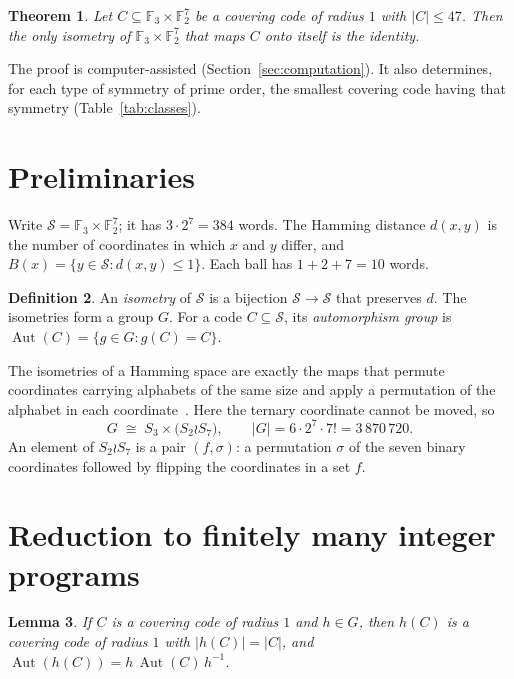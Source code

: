 \documentclass[11pt]{article}
\newtheorem{theorem}{Theorem}
\newtheorem{lemma}[theorem]{Lemma}
\theoremstyle{definition}
\newtheorem{definition}[theorem]{Definition}
\theoremstyle{remark}
\newcommand{\F}{\mathbb{F}}
\newcommand{\Sp}{\mathcal{S}}
\newcommand{\Aut}{\operatorname{Aut}}
\begin{document}
\begin{theorem}\label{thm:main}
Let $C\subseteq\F_3\times\F_2^7$ be a covering code of radius $1$ with $|C|\le 47$. Then the
only isometry of $\F_3\times\F_2^7$ that maps $C$ onto itself is the identity.
\end{theorem}

The proof is computer-assisted (Section~\ref{sec:computation}). It also determines, for each
type of symmetry of prime order, the smallest covering code having that symmetry
(Table~\ref{tab:classes}).


\section{Preliminaries}

Write $\Sp=\F_3\times\F_2^7$; it has $3\cdot 2^7=384$ words. The Hamming distance $d(x,y)$ is the
number of coordinates in which $x$ and $y$ differ, and $B(x)=\{y\in\Sp: d(x,y)\le 1\}$. Each
ball has $1+2+7=10$ words.

\begin{definition}
An \emph{isometry} of $\Sp$ is a bijection $\Sp\to\Sp$ that preserves $d$. The isometries form a
group $G$. For a code $C\subseteq\Sp$, its \emph{automorphism group} is
$\Aut(C)=\{g\in G: g(C)=C\}$.
\end{definition}

The isometries of a Hamming space are exactly the maps that permute coordinates carrying
alphabets of the same size and apply a permutation of the alphabet in each
coordinate~\cite{cohen-book}. Here the ternary coordinate cannot be moved, so
\[
G \;\cong\; S_3 \times \bigl(S_2 \wr S_7\bigr),
\qquad |G| = 6\cdot 2^7\cdot 7! = 3\,870\,720 .
\]
An element of $S_2\wr S_7$ is a pair $(f,\sigma)$: a permutation $\sigma$ of the seven binary
coordinates followed by flipping the coordinates in a set $f$.

\section{Reduction to finitely many integer programs}

\begin{lemma}\label{lem:conj}
If $C$ is a covering code of radius $1$ and $h\in G$, then $h(C)$ is a covering code of radius
$1$ with $|h(C)|=|C|$, and $\Aut(h(C)) = h\,\Aut(C)\,h^{-1}$.
\end{lemma}
\end{document}
